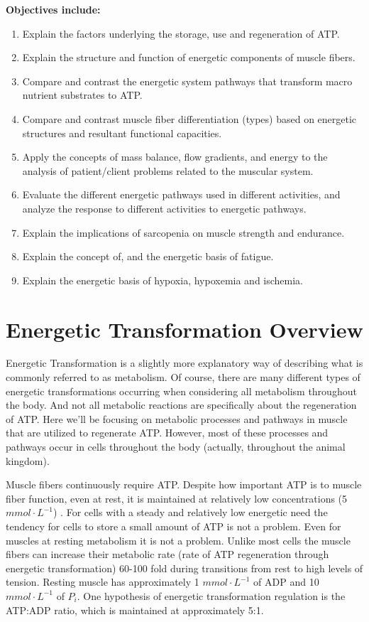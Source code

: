 \textbf{Objectives include:}
\begin{enumerate}
    \item Explain the factors underlying the storage, use and regeneration of ATP.
    \item Explain the structure and function of energetic components of muscle fibers.
    \item Compare and contrast the energetic system pathways that transform macro nutrient substrates to ATP.
    \item Compare and contrast muscle fiber differentiation (types) based on energetic structures and resultant functional capacities.
    \item  Apply the concepts of mass balance, flow gradients, and energy to the analysis of patient/client problems related to the muscular system.
     \item Evaluate the different energetic pathways used in different activities, and analyze the response to different activities to energetic pathways.
     \item Explain the implications of sarcopenia on muscle strength and endurance.
     \item Explain the concept of, and the energetic basis of fatigue.
     \item Explain the energetic basis of hypoxia, hypoxemia and ischemia.
\end{enumerate}

\section{Energetic Transformation Overview}

Energetic Transformation is a slightly more explanatory way of describing what is commonly referred to as metabolism. Of course, there are many different types of energetic transformations occurring when considering all metabolism throughout the body. And not all metabolic reactions are specifically about the regeneration of ATP. Here we'll be focusing on metabolic processes and pathways in muscle that are utilized to regenerate ATP. However, most of these processes and pathways occur in cells throughout the body (actually, throughout the animal kingdom). 

Muscle fibers continuously require ATP. Despite how important ATP is to muscle fiber function, even at rest, it is maintained at relatively low concentrations (5 $mmol \cdot L^{-1}$) \cite{feher_quantitative_2017, jones_skeletal_2006}. For cells with a steady and relatively low energetic need the tendency for cells to store a small amount of ATP is not a problem. Even for muscles at resting metabolism it is not a problem. Unlike most cells the muscle fibers can increase their metabolic rate (rate of ATP regeneration through energetic transformation) 60-100 fold during transitions from rest to high levels of tension. Resting muscle has approximately 1 $mmol \cdot L^{-1}$ of ADP and 10 $mmol \cdot L^{-1}$ of $P_i$. One hypothesis of energetic transformation regulation is the ATP:ADP ratio, which is maintained at approximately 5:1.

